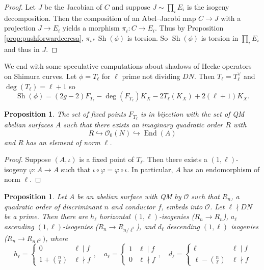 \documentclass[12pt]{amsart}
\newcommand{\calO}{\mathcal{O}}
\DeclareMathOperator{\End}{End}
\DeclareMathOperator{\Sh}{Sh}
\numberwithin{equation}{subsection}
\theoremstyle{plain}\newtheorem{ithm}{Theorem}
\theoremstyle{plain}\newtheorem{iprop}[ithm]{Proposition}
\newtheorem{proposition}[equation]{Proposition}
\theoremstyle{definition}
\theoremstyle{remark}
\newcommand{\Order}{\calO} %
\begin{document}
\begin{proof}
Let $J$ be the Jacobian of $C$ and suppose $J \sim \prod_i E_i$ is the isogeny decomposition. Then the composition of an Abel--Jacobi map $C \to J$ with a projection $J \to E_i$ yields a morphism $\pi_i :C \to E_i$.
Thus by Proposition \ref{prop:pushforwardceresa},  $\pi_{i*} \Sh(\phi)$ is torsion. So $\Sh(\phi)$ is torsion in $\prod_i E_i$ and thus in $J$.
\end{proof}



We end with some speculative computations about shadows of Hecke operators on Shimura curves.
Let $\phi = T_\ell$ for $\ell$ prime not dividing $DN$.
Then  $T_\ell = T_\ell^\vee$ and $\deg(T_\ell) = \ell+1$ so 
\begin{equation} \Sh(\phi) = (2g -2) F_{T_\ell} - \deg(F_{T_\ell}) K_X - 2 T_\ell(K_X) + 2 (\ell+1) K_X.
\end{equation}

\begin{proposition}
The set of fixed points $F_{T_\ell}$ is in bijection with the set of QM abelian surfaces $A$ such that there exists an imaginary quadratic order $R$ with \[R \hookrightarrow \Order_0(N) \hookrightarrow\End(A)\] and $R$ has an element of norm $\ell$.
\end{proposition}
\begin{proof}
Suppose $(A, \iota)$ is a fixed point of $T_{\ell}$. Then there exists a $(1, \ell)$-isogeny $\varphi : A \to A$ such that $\iota \circ \varphi = \varphi \circ \iota$. In particular, $A$ has an endomorphism of norm $\ell$.  
\end{proof}


\begin{proposition}
\label{prop:mult}
    Let $A$ be an abelian surface with QM by $\Order$ such that $R_n $, a quadratic order of discriminant $n$ and conductor $f$, embeds into $\calO$. Let $\ell \nmid DN$ be a prime. Then there are $h_{\ell}$ horizontal $(1,\ell)$-isogenies ($R_n \to R_n$), $a_{\ell}$ ascending $(1,\ell)$-isogenies ($R_n \to R_{n / \ell^2}$), and $d_{\ell}$ descending $(1,\ell)$ isogenies ($R_n \to R_{n \ell^2})$, where
    $$
    h_{\ell} = \begin{cases}
        0 & \ell \mid f \\
        1 + \left(\frac{n}{\ell}\right) & \ell \nmid f
    \end{cases},\quad
    a_{\ell} = \begin{cases}
        1 & \ell \mid f \\
        0 & \ell \nmid f
    \end{cases}, \quad 
    d_{\ell} = \begin{cases}
        \ell & \ell \mid f \\
        \ell - \left(\frac{n}{\ell}\right) & \ell \nmid f
    \end{cases}
    $$
\end{proposition}
\end{document}
